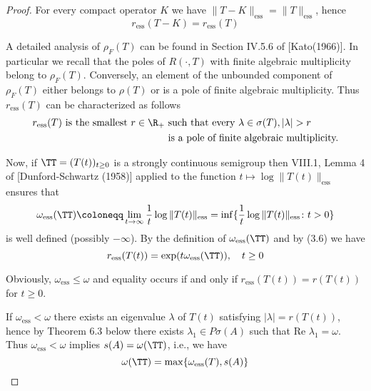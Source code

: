 \begin{proof}
For every compact operator $K$ we have $\|T - K\|_{\text{ess}} = \|T\|_{\text{ess}}$, hence
\begin{equation}\label{eq:a3-3.7}
r_{\text{ess}}(T - K) = r_{\text{ess}}(T)
\end{equation}


\newpage
A detailed analysis of $\rho_{F}(T)$ can be found in Section IV.5.6 of [Kato(1966)].
In particular we recall that the poles of $R(\cdot,T)$ with finite algebraic multiplicity belong to $\rho_{F}(T)$.
Conversely, an element of the unbounded component of $\rho_{F}(T)$ either belongs to $\rho(T)$ or is a pole of finite algebraic multiplicity.
Thus $r_{\text{ess}}(T)$ can be characterized as follows
\begin{equation}\label{eq:a3-3.8}
\begin{split}
r_{\text{ess}}(T) \text{ is the smallest } r \in \R_{+} 
& \text{ such that every } \lambda \in \sigma(T), |\lambda| > r \\
& \text{ is a pole of finite algebraic multiplicity.}
\end{split}
\end{equation}

Now, if $\TT = (T(t))_{t \geq 0}$ is a strongly continuous semigroup then VIII.1, Lemma 4 of [Dunford-Schwartz (1958)] applied to the function $t \mapsto \log \|T(t)\|_{\text{ess}}$ ensures that
\begin{equation}\label{eq:a3-3.9}
\omega_{\text{ess}}(\TT) \coloneqq \lim_{t \to \infty} \frac{1}{t} \log\|T(t)\|_{\text{ess}} = \inf \{\frac{1}{t} \log\|T(t)\|_{\text{ess}} \colon t > 0\}
\end{equation}
is well defined (possibly $-\infty$).
By the definition of $\omega_{\text{ess}}(\TT)$ and by (3.6) we have
\begin{equation}\label{eq:a3-3.10}
r_{\text{ess}}(T(t)) = \exp(t\omega_{\text{ess}}(\TT)), \quad t \geq 0
\end{equation}

Obviously, $\omega_{\text{ess}} \leq \omega$ and equality occurs if and only if $r_{\text{ess}}(T(t)) = r(T(t))$ for $t \geq 0$.

If $\omega_{\text{ess}} < \omega$ there exists an eigenvalue $\lambda$ of $T(t)$ satisfying $|\lambda| = r(T(t))$, hence by Theorem 6.3 below there exists $\lambda_{1} \in P\sigma(A)$ such that $\text{Re }\lambda_{1} = \omega$.
Thus $\omega_{\text{ess}} < \omega$ implies $s(A) = \omega(\TT)$, i.e., we have
\begin{equation}\label{eq:a3-3.11}
\omega(\TT) = \max\{\omega_{\text{ess}}(T),s(A)\}
\end{equation}


\end{proof}
